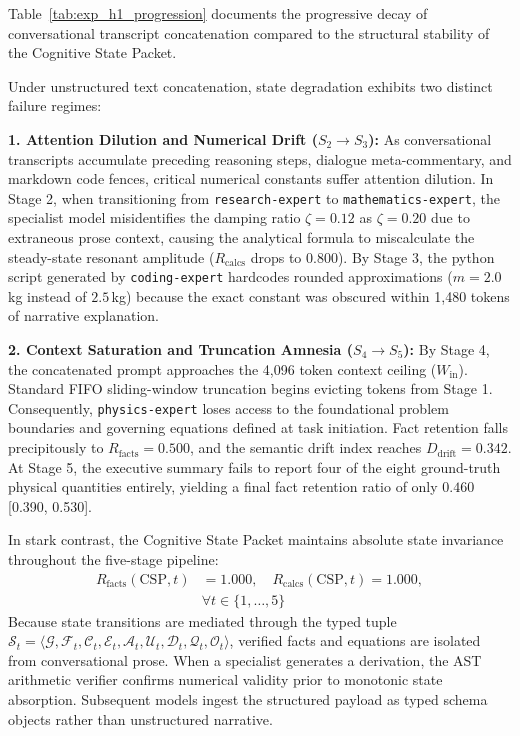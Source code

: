 Table~\ref{tab:exp_h1_progression} documents the progressive decay of conversational transcript concatenation compared to the structural stability of the Cognitive State Packet.

Under unstructured text concatenation, state degradation exhibits two distinct failure regimes:

\textbf{1. Attention Dilution and Numerical Drift ($S_2 \to S_3$):} As conversational transcripts accumulate preceding reasoning steps, dialogue meta-commentary, and markdown code fences, critical numerical constants suffer attention dilution. In Stage 2, when transitioning from \texttt{research-expert} to \texttt{mathematics-expert}, the specialist model misidentifies the damping ratio $\zeta = 0.12$ as $\zeta = 0.20$ due to extraneous prose context, causing the analytical formula to miscalculate the steady-state resonant amplitude ($R_{\text{calcs}}$ drops to $0.800$). By Stage 3, the python script generated by \texttt{coding-expert} hardcodes rounded approximations ($m = 2.0$\,kg instead of $2.5$\,kg) because the exact constant was obscured within 1,480 tokens of narrative explanation.

\textbf{2. Context Saturation and Truncation Amnesia ($S_4 \to S_5$):} By Stage 4, the concatenated prompt approaches the 4,096 token context ceiling ($W_{\text{in}}$). Standard FIFO sliding-window truncation begins evicting tokens from Stage 1. Consequently, \texttt{physics-expert} loses access to the foundational problem boundaries and governing equations defined at task initiation. Fact retention falls precipitously to $R_{\text{facts}} = 0.500$, and the semantic drift index reaches $D_{\text{drift}} = 0.342$. At Stage 5, the executive summary fails to report four of the eight ground-truth physical quantities entirely, yielding a final fact retention ratio of only $0.460$ [0.390, 0.530].

In stark contrast, the Cognitive State Packet maintains absolute state invariance throughout the five-stage pipeline:
\begin{equation}
\begin{aligned}
R_{\text{facts}}(\text{CSP}, t) &= 1.000, \quad R_{\text{calcs}}(\text{CSP}, t) = 1.000, \\
&\forall t \in \{1, \dots, 5\}
\end{aligned}
\end{equation}
Because state transitions are mediated through the typed tuple $\mathcal{S}_t = \langle \mathcal{G}, \mathcal{F}_t, \mathcal{C}_t, \mathcal{E}_t, \mathcal{A}_t, \mathcal{U}_t, \mathcal{D}_t, \mathcal{Q}_t, \mathcal{O}_t \rangle$, verified facts and equations are isolated from conversational prose. When a specialist generates a derivation, the AST arithmetic verifier confirms numerical validity prior to monotonic state absorption. Subsequent models ingest the structured payload as typed schema objects rather than unstructured narrative.

